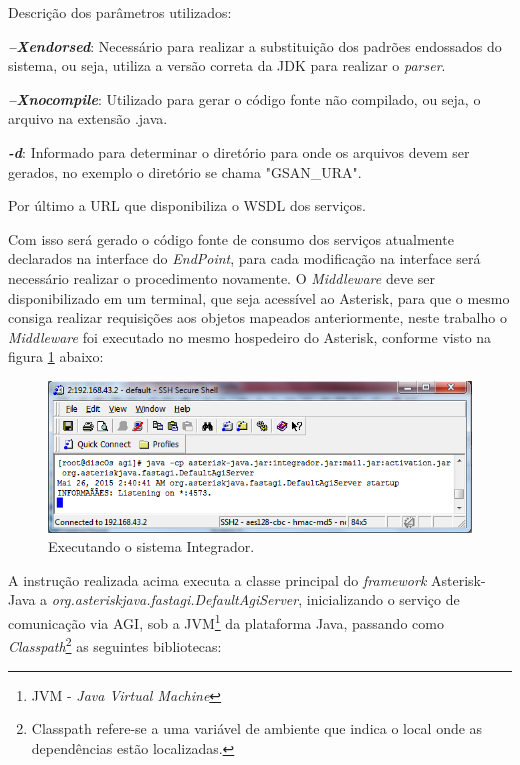 Descrição dos parâmetros utilizados:

\begin{description}
	\item \textbf{\textit{–Xendorsed}}: Necessário para realizar a substituição dos padrões endossados do sistema, ou seja, utiliza a versão correta da JDK para realizar o \textit{parser}.
	\item \textbf{\textit{–Xnocompile}}: Utilizado para gerar o código fonte não compilado, ou seja, o arquivo na extensão .java.
	\item \textbf{\textit{-d}}: Informado para determinar o diretório para onde os arquivos devem ser gerados, no exemplo o diretório se chama "GSAN\_URA".
	\item Por último a URL que disponibiliza o WSDL dos serviços. 
\end{description}



Com isso será gerado o código fonte de consumo dos serviços atualmente declarados na interface do \textit{EndPoint}, para cada modificação na interface será necessário realizar o procedimento novamente. O \textit{Middleware} deve ser disponibilizado em um terminal, que seja acessível ao Asterisk, para que o mesmo consiga realizar requisições aos objetos mapeados anteriormente, neste trabalho o \textit{Middleware} foi executado no mesmo hospedeiro do Asterisk, conforme visto na figura \ref{figura:executarIntegrador} abaixo:

\begin{figure}[H]
	\centering
	\caption{Executando o sistema Integrador.}	
	\label{figura:executarIntegrador}
	\includegraphics{figuras/executar_integrador.png}
\end{figure}


A instrução realizada acima executa a classe principal do \textit{framework} Asterisk-Java a \textit{ org.asteriskjava.fastagi.DefaultAgiServer}, inicializando o serviço de comunicação via AGI, sob a JVM\footnote{JVM - \textit{Java Virtual Machine}} da plataforma Java, passando como \textit{Classpath}\footnote{Classpath refere-se a uma variável de ambiente que indica o local onde as dependências estão localizadas.} as seguintes bibliotecas: 

